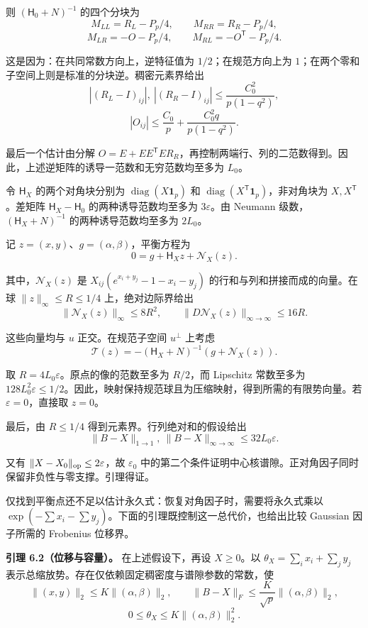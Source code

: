 \documentclass[11pt,a4paper]{article}
\makeatletter
\newcommand{\paperstatement}[3]{\par\addvspace{6pt}\Needspace{4\baselineskip}\phantomsection\def\@currentlabel{#2}\label{#3}\noindent\textbf{#1}\enspace}
\makeatother
\begin{document}
则 \((\mathsf H_0+N)^{-1}\) 的四个分块为
\[M_{LL}=R_L-P_p/4,\qquad M_{RR}=R_R-P_p/4,\]
\nopagebreak[3]\[M_{LR}=-O-P_p/4,\qquad M_{RL}=-O^{\mathsf T}-P_p/4.\]

这是因为：在共同常数方向上，逆特征值为 \(1/2\)；在规范方向上为 \(1\)；在两个零和子空间上则是标准的分块逆。稠密元素界给出
\[|(R_L-I)_{ij}|,\ |(R_R-I)_{ij}|\le\frac{C_0^2}{p(1-q^2)},\]
\nopagebreak[3]\[|O_{ij}|\le\frac{C_0}{p}+\frac{C_0^2q}{p(1-q^2)}.\]

最后一个估计由分解 \(O=E+EE^{\mathsf T}ER_R\)，再控制两端行、列的二范数得到。因此，上述逆矩阵的诱导一范数和无穷范数均至多为 \(L_0\)。

令 \(\mathsf H_X\) 的两个对角块分别为 \(\operatorname{diag}(X\mathbf 1_p)\) 和 \(\operatorname{diag}(X^{\mathsf T}\mathbf 1_p)\)，非对角块为 \(X,X^{\mathsf T}\)。差矩阵 \(\mathsf H_X-\mathsf H_0\) 的两种诱导范数均至多为 \(3\varepsilon\)。由 Neumann 级数，\((\mathsf H_X+N)^{-1}\) 的两种诱导范数均至多为 \(2L_0\)。

记 \(z=(x,y)\)、\(g=(\alpha,\beta)\)，平衡方程为
\[0=g+\mathsf H_Xz+\mathcal N_X(z).\]

其中，\(\mathcal N_X(z)\) 是 \(X_{ij}(e^{x_i+y_j}-1-x_i-y_j)\) 的行和与列和拼接而成的向量。在球 \(\|z\|_\infty\le R\le1/4\) 上，绝对边际界给出
\[\|\mathcal N_X(z)\|_\infty\le8R^2,\qquad \|D\mathcal N_X(z)\|_{\infty\to\infty}\le16R.\]

这些向量均与 \(u\) 正交。在规范子空间 \(u^\perp\) 上考虑
\[\mathcal T(z)=-(\mathsf H_X+N)^{-1}(g+\mathcal N_X(z)).\]

取 \(R=4L_0\varepsilon\)。原点的像的范数至多为 \(R/2\)，而 Lipschitz 常数至多为 \(128L_0^2\varepsilon\le1/2\)。因此，映射保持规范球且为压缩映射，得到所需的有限势向量。若 \(\varepsilon=0\)，直接取 \(z=0\)。

最后，由 \(R\le1/4\) 得到元素界。行列绝对和的假设给出
\[\|B-X\|_{1\to1},\ \|B-X\|_{\infty\to\infty}\le32L_0\varepsilon.\]

又有 \(\|X-X_0\|_{\rm op}\le2\varepsilon\)，故 \(\varepsilon_0\) 中的第二个条件证明中心核谱隙。正对角因子同时保留非负性与零支撑。引理得证。

仅找到平衡点还不足以估计永久式：恢复对角因子时，需要将永久式乘以 \(\exp(-\sum x_i-\sum y_j)\)。下面的引理既控制这一总代价，也给出比较 Gaussian 因子所需的 Frobenius 位移界。

\paperstatement{引理 6.2（位移与容量）。}{6.2}{thm-6.2} 在上述假设下，再设 \(X\ge0\)。以 \(\theta_X=\sum_i x_i+\sum_j y_j\) 表示总缩放势。存在仅依赖固定稠密度与谱隙参数的常数，使
\[\|(x,y)\|_2\le K\|(\alpha,\beta)\|_2,\qquad \|B-X\|_F\le\frac K{\sqrt p}\|(\alpha,\beta)\|_2,\]
\nopagebreak[3]\[0\le\theta_X\le K\|(\alpha,\beta)\|_2^2.\]
\end{document}
